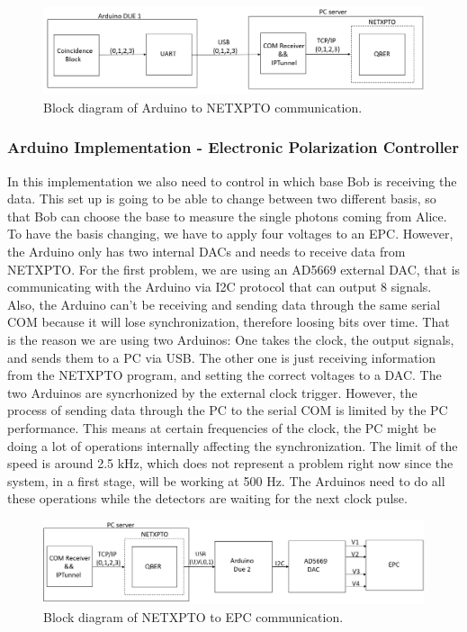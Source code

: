 \begin{refsection}
		\begin{figure}[H]
			\centering
			\includegraphics[width=1\linewidth]{./sdf/arduino_quantum_rx/figures/PC.png}
			\caption{Block diagram of Arduino to NETXPTO communication.}
			\label{fig:netxpto}
		\end{figure}
	
	
	\subsubsection{Arduino Implementation - Electronic Polarization Controller }
	In this implementation we also need to control in which base Bob is receiving the data. This set up is going to be able to change between two different basis, so that Bob can choose the base to measure the single photons coming from Alice. To have the basis changing, we have to apply four voltages to an EPC. However, the Arduino only has two internal DACs and needs to receive data from NETXPTO. For the first problem, we are using an AD5669 external DAC, that is communicating with the Arduino via I2C protocol that can output 8 signals. Also, the Arduino can't be receiving and sending data through the same serial COM because it will lose synchronization, therefore loosing bits over time. That is the reason we are using two Arduinos: One takes the clock, the output signals, and sends them to a PC via USB. The other one is just receiving information from the NETXPTO program, and setting the correct voltages to a DAC. The two Arduinos are syncrhonized by the external clock trigger. However, the process of sending data through the PC to the serial COM  is limited by the PC performance. This means at certain frequencies of the clock, the PC might be doing a lot of operations internally affecting the synchronization. The limit of the speed is around 2.5 kHz, which does not represent a problem right now since the system, in a first stage, will be working at 500 Hz. The Arduinos need to do all these operations while the detectors are waiting for the next clock pulse. 
	
	
	\begin{figure}[H]
		
		\centering
		\includegraphics[width=1\linewidth]{./sdf/arduino_quantum_rx/figures/DAC.png}
		\caption{Block diagram of NETXPTO to EPC communication.}
		\label{fig:netxpto}
		

\end{figure}
\end{refsection}
